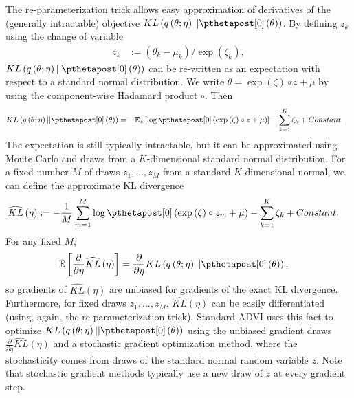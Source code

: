 \documentclass{article}\usepackage[]{graphicx}\usepackage[]{color}
\theoremstyle{definition}
\theoremstyle{plain}
\theoremstyle{plain}
\theoremstyle{plain}
\theoremstyle{definition}
\theoremstyle{plain}
\theoremstyle{plain}
\begin{document}
The re-parameterization trick allows easy
approximation of derivatives of the (generally intractable) objective
$KL\left(q\left(\theta;\eta\right)||\pzeropost\left(\theta\right)\right)$.
By defining $z_{k}$ using the change of variable
\begin{align}
z_k &:= (\theta_k - \mu_k) / \exp\left(\zeta_{k}\right), \label{eq:advi_theta}
\end{align}
$KL\left(q\left(\theta;\eta\right)||\pzeropost\left(\theta\right)\right)$
can be re-written as an expectation with respect to a standard normal
distribution. We write $\theta=\exp\left(\zeta\right)\circ z+\mu$
by using the component-wise Hadamard product $\circ$. Then
\begin{align*}
KL\left(q\left(\theta;\eta\right)||\pzeropost\left(\theta\right)\right) & =
    -\mbe_{z}\left[\log\pzeropost\left(\exp\left(\zeta\right)\circ z +
    \mu\right)\right]-\sum_{k=1}^{K}\zeta_{k}+\constant.
\end{align*}
The expectation is still typically intractable, but it can be approximated
using Monte Carlo and draws from a $K$-dimensional standard normal
distribution. For a fixed number $M$ of draws $z_{1},...,z_{M}$
from a standard $K$-dimensional normal, we can define the approximate
KL divergence
\begin{align}
\widehat{KL}\left(\eta\right) &
    :=-\frac{1}{M}\sum_{m=1}^{M}\log\pzeropost\left(
        \exp\left(\zeta\right)\circ z_{m}+\mu\right) -
        \sum_{k=1}^{K}\zeta_{k} +\constant.\label{eq:monte_carlo_approx_kl}
\end{align}
For any fixed $M$,
\begin{align*}
\mbe\left[\frac{\partial}{\partial\eta}\widehat{KL}\left(\eta\right)\right] &
    =\frac{\partial}{\partial\eta}KL\left(q\left(\theta;\eta\right)||
        \pzeropost\left(\theta\right)\right),
\end{align*}
so gradients of $\widehat{KL}\left(\eta\right)$ are unbiased for
gradients of the exact KL divergence. Furthermore, for fixed draws
$z_{1},...,z_{M}$, $\widehat{KL}\left(\eta\right)$ can be easily
differentiated (using, again, the re-parameterization trick). Standard
ADVI uses this fact to optimize
$KL\left(q\left(\theta;\eta\right)||\pzeropost\left(\theta\right)\right)$
using the unbiased gradient draws
$\frac{\partial}{\partial\eta}\widehat{KL}\left(\eta\right)$
and a stochastic gradient optimization method, where the stochasticity
comes from draws of the standard normal random variable $z$. Note
that stochastic gradient methods typically use a new draw of $z$
at every gradient step.
\end{document}
